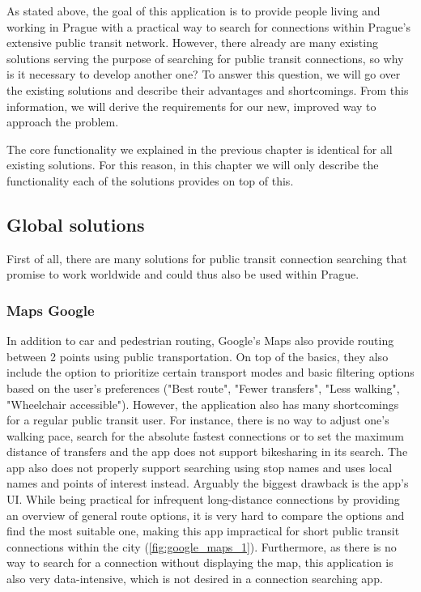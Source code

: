 As stated above, the goal of this application is to provide people living and working in Prague with a practical way to search for connections within Prague's extensive public transit network. However, there already are many existing solutions serving the purpose of searching for public transit connections, so why is it necessary to develop another one? To answer this question, we will go over the existing solutions and describe their advantages and shortcomings. From this information, we will derive the requirements for our new, improved way to approach the problem.

The core functionality we explained in the previous chapter is identical for all existing solutions. For this reason, in this chapter we will only describe the functionality each of the solutions provides on top of this.

\subsection{Global solutions}

First of all, there are many solutions for public transit connection searching that promise to work worldwide and could thus also be used within Prague.

\subsubsection{Maps Google}
In addition to car and pedestrian routing, Google's Maps also provide routing between 2 points using public transportation. On top of the basics, they also include the option to prioritize certain transport modes and basic filtering options based on the user's preferences ("Best route", "Fewer transfers", "Less walking", "Wheelchair accessible"). However, the application also has many shortcomings for a regular public transit user. For instance, there is no way to adjust one's walking pace, search for the absolute fastest connections or to set the maximum distance of transfers and the app does not support bikesharing in its search. The app also does not properly support searching using stop names and uses local names and points of interest instead. Arguably the biggest drawback is the app's UI. While being practical for infrequent long-distance connections by providing an overview of general route options, it is very hard to compare the options and find the most suitable one, making this app impractical for short public transit connections within the city (\cref{fig:google_maps_1}). Furthermore, as there is no way to search for a connection without displaying the map, this application is also very data-intensive, which is not desired in a connection searching app.

